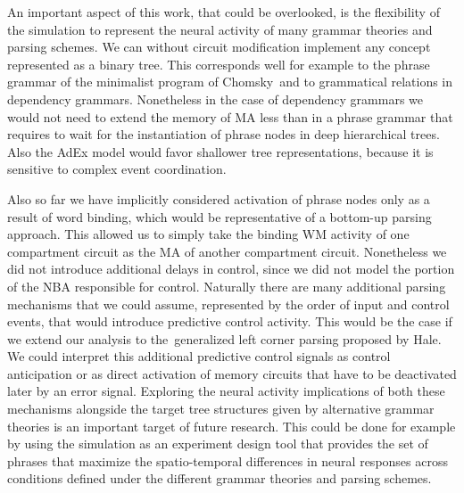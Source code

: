 \documentclass[10pt]{article}
\begin{document}
An important aspect of this work, that could be overlooked, is the flexibility of the simulation to represent the neural activity of many grammar theories and parsing schemes.
We can without circuit modification implement any concept represented as a binary tree.
This corresponds well for example to the phrase grammar of the minimalist program of Chomsky\cite{Chomsky_2014}~and to grammatical relations in dependency grammars\cite{nivre2005dependency}.
Nonetheless in the case of dependency grammars we would not need to extend the memory of MA less than in a phrase grammar that requires to wait for the instantiation of phrase nodes in deep hierarchical trees.
Also the AdEx model would favor shallower tree representations, because it is sensitive to complex event coordination.

Also so far we have implicitly considered activation of phrase nodes only as a result of word binding, which would be representative of a bottom-up parsing approach.
This allowed us to simply take the binding WM activity of one compartment circuit as the MA of another compartment circuit.
Nonetheless we did not introduce additional delays in control, since we did not model the portion of the NBA responsible for control.
Naturally there are many additional parsing mechanisms that we could assume, represented by the order of input and control events, that would introduce predictive control activity.
This would be the case if we extend our analysis to the~generalized left corner parsing proposed by Hale\cite{hale2014automaton}.
We could interpret this additional predictive control signals as control anticipation or as direct activation of memory circuits that have to be deactivated later by an error signal.
Exploring the neural activity implications of both these mechanisms alongside the target tree structures given by alternative grammar theories is an important target of future research.
This could be done for example by using the simulation as an experiment design tool that provides the set of phrases that maximize the spatio-temporal differences in neural responses across conditions defined under the different grammar theories and parsing schemes.
\end{document}

